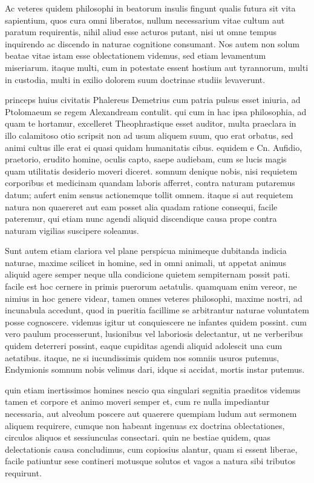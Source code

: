  Ac veteres quidem philosophi in beatorum insulis fingunt qualis futura sit vita sapientium, quos cura omni liberatos, nullum necessarium vitae cultum aut paratum requirentis, nihil aliud esse acturos putant, nisi ut omne tempus inquirendo ac discendo in naturae cognitione consumant. Nos autem non solum beatae vitae istam esse oblectationem videmus, sed etiam levamentum miseriarum. itaque multi, cum in potestate essent hostium aut tyrannorum, multi in custodia, multi in exilio dolorem suum doctrinae studiis levaverunt.

 princeps huius civitatis Phalereus Demetrius cum patria pulsus esset iniuria, ad Ptolomaeum se regem Alexandream contulit. qui cum in hac ipsa philosophia, ad quam te hortamur, excelleret Theophrastique esset auditor, multa praeclara in illo calamitoso otio scripsit non ad usum aliquem suum, quo erat orbatus, sed animi cultus ille erat ei quasi quidam humanitatis cibus. equidem e Cn. Aufidio, praetorio, erudito homine, oculis capto, saepe audiebam, cum se lucis magis quam utilitatis desiderio moveri diceret. somnum denique nobis, nisi requietem corporibus et medicinam quandam laboris afferret, contra naturam putaremus datum; aufert enim sensus actionemque tollit omnem. itaque si aut requietem natura non quaereret aut eam posset alia quadam ratione consequi, facile pateremur, qui etiam nunc agendi aliquid discendique causa prope contra naturam vigilias suscipere soleamus.

 Sunt autem etiam clariora vel plane perspicua minimeque dubitanda indicia naturae, maxime scilicet in homine, sed in omni animali, ut appetat animus aliquid agere semper neque ulla condicione quietem sempiternam possit pati. facile est hoc cernere in primis puerorum aetatulis. quamquam enim vereor, ne nimius in hoc genere videar, tamen omnes veteres philosophi, maxime nostri, ad incunabula accedunt, quod in pueritia facillime se arbitrantur naturae voluntatem posse cognoscere. videmus igitur ut conquiescere ne infantes quidem possint. cum vero paulum processerunt, lusionibus vel laboriosis delectantur, ut ne verberibus quidem deterreri possint, eaque cupiditas agendi aliquid adolescit una cum aetatibus. itaque, ne si iucundissimis quidem nos somniis usuros putemus, Endymionis somnum nobis velimus dari, idque si accidat, mortis instar putemus.

 quin etiam inertissimos homines nescio qua singulari segnitia praeditos videmus tamen et corpore et animo moveri semper et, cum re nulla impediantur necessaria, aut alveolum poscere aut quaerere quempiam ludum aut sermonem aliquem requirere, cumque non habeant ingenuas ex doctrina oblectationes, circulos aliquos et sessiunculas consectari. quin ne bestiae quidem, quas delectationis causa concludimus, cum copiosius alantur, quam si essent liberae, facile patiuntur sese contineri motusque solutos et vagos a natura sibi tributos requirunt.


